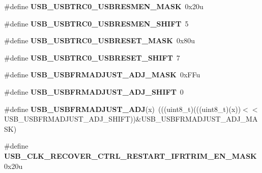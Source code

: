 \begin{DoxyCompactItemize}
\item 
\#define {\bfseries U\+S\+B\+\_\+\+U\+S\+B\+T\+R\+C0\+\_\+\+U\+S\+B\+R\+E\+S\+M\+E\+N\+\_\+\+M\+A\+SK}~0x20u\hypertarget{group__USB__Register__Masks_gaf236b1fdfa7f7dab54961c74538dfb75}{}\label{group__USB__Register__Masks_gaf236b1fdfa7f7dab54961c74538dfb75}

\item 
\#define {\bfseries U\+S\+B\+\_\+\+U\+S\+B\+T\+R\+C0\+\_\+\+U\+S\+B\+R\+E\+S\+M\+E\+N\+\_\+\+S\+H\+I\+FT}~5\hypertarget{group__USB__Register__Masks_ga4b62f293769f60cae99319d6bb1299e8}{}\label{group__USB__Register__Masks_ga4b62f293769f60cae99319d6bb1299e8}

\item 
\#define {\bfseries U\+S\+B\+\_\+\+U\+S\+B\+T\+R\+C0\+\_\+\+U\+S\+B\+R\+E\+S\+E\+T\+\_\+\+M\+A\+SK}~0x80u\hypertarget{group__USB__Register__Masks_ga3b307f8358be6942775121b6a92243ab}{}\label{group__USB__Register__Masks_ga3b307f8358be6942775121b6a92243ab}

\item 
\#define {\bfseries U\+S\+B\+\_\+\+U\+S\+B\+T\+R\+C0\+\_\+\+U\+S\+B\+R\+E\+S\+E\+T\+\_\+\+S\+H\+I\+FT}~7\hypertarget{group__USB__Register__Masks_gab20fcb9276a34cbbd33ac0364c419f13}{}\label{group__USB__Register__Masks_gab20fcb9276a34cbbd33ac0364c419f13}

\item 
\#define {\bfseries U\+S\+B\+\_\+\+U\+S\+B\+F\+R\+M\+A\+D\+J\+U\+S\+T\+\_\+\+A\+D\+J\+\_\+\+M\+A\+SK}~0x\+F\+Fu\hypertarget{group__USB__Register__Masks_ga3bbdc3dbdf46947a16a7b4429ad9a0c7}{}\label{group__USB__Register__Masks_ga3bbdc3dbdf46947a16a7b4429ad9a0c7}

\item 
\#define {\bfseries U\+S\+B\+\_\+\+U\+S\+B\+F\+R\+M\+A\+D\+J\+U\+S\+T\+\_\+\+A\+D\+J\+\_\+\+S\+H\+I\+FT}~0\hypertarget{group__USB__Register__Masks_ga81985f8c59f9aa0c0340a70136b55098}{}\label{group__USB__Register__Masks_ga81985f8c59f9aa0c0340a70136b55098}

\item 
\#define {\bfseries U\+S\+B\+\_\+\+U\+S\+B\+F\+R\+M\+A\+D\+J\+U\+S\+T\+\_\+\+A\+DJ}(x)~(((uint8\+\_\+t)(((uint8\+\_\+t)(x))$<$$<$U\+S\+B\+\_\+\+U\+S\+B\+F\+R\+M\+A\+D\+J\+U\+S\+T\+\_\+\+A\+D\+J\+\_\+\+S\+H\+I\+FT))\&U\+S\+B\+\_\+\+U\+S\+B\+F\+R\+M\+A\+D\+J\+U\+S\+T\+\_\+\+A\+D\+J\+\_\+\+M\+A\+SK)\hypertarget{group__USB__Register__Masks_ga9425a289b2e719d6aad583a33ddf1e4b}{}\label{group__USB__Register__Masks_ga9425a289b2e719d6aad583a33ddf1e4b}

\item 
\#define {\bfseries U\+S\+B\+\_\+\+C\+L\+K\+\_\+\+R\+E\+C\+O\+V\+E\+R\+\_\+\+C\+T\+R\+L\+\_\+\+R\+E\+S\+T\+A\+R\+T\+\_\+\+I\+F\+R\+T\+R\+I\+M\+\_\+\+E\+N\+\_\+\+M\+A\+SK}~0x20u\hypertarget{group__USB__Register__Masks_ga77dc2ce9a51eff644d449abfa8228935}{}\label{group__USB__Register__Masks_ga77dc2ce9a51eff644d449abfa8228935}


\end{DoxyCompactItemize}
